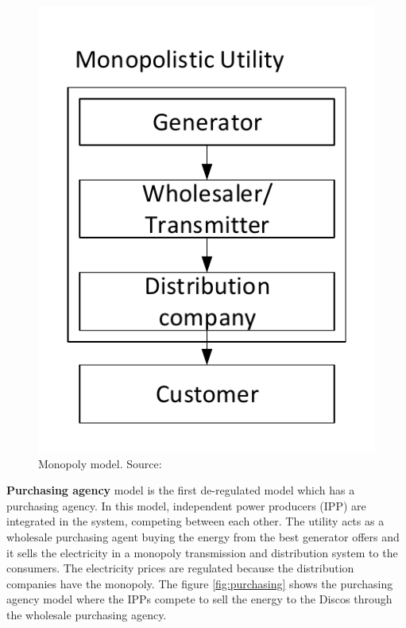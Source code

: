 \documentclass[a4paper,11pt,twoside,openright]{report}
\begin{document}
\begin{figure}[h!]
	\centering
	\includegraphics[scale=0.7]{Visios/Market_competition_Monopoly}
	\caption{Monopoly  model. Source: \cite{Economics_Kirschen}}
	\label{fig:monopoly}
\end{figure}

\textbf{Purchasing agency} model is the first de-regulated model which has a purchasing agency. In this model, independent power producers (IPP) are integrated in the system, competing between each other. The utility acts as a wholesale purchasing agent buying the energy from the best generator offers and it sells the electricity in a monopoly transmission and distribution system to the consumers. The electricity prices are regulated because the distribution companies have the monopoly. The figure \ref{fig:purchasing} shows the purchasing agency model where the IPPs compete to sell the energy to the Discos through the wholesale purchasing agency.
\end{document}
